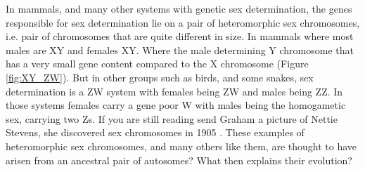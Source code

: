 In mammals, and many other systems with genetic sex determination, the genes responsible for sex determination lie on a pair of heteromorphic sex chromosomes, i.e. pair of chromosomes that are quite different in size. In mammals where most males are XY and females XY. Where the male determining Y chromosome that has a very small gene content compared to the X chromosome (Figure \ref{fig:XY_ZW}). But in other groups such as birds, and some snakes, sex determination is a ZW system with females being ZW and males being ZZ. In those systems females carry a gene poor W with males being the homogametic sex, carrying two Zs.  If you are still reading send Graham a picture of Nettie Stevens, she discovered sex chromosomes in 1905 \citep{stevens1905studies}. These examples of heteromorphic sex chromosomes, and many others like them, are thought to have arisen from an ancestral pair of autosomes? What then explains their evolution? %


